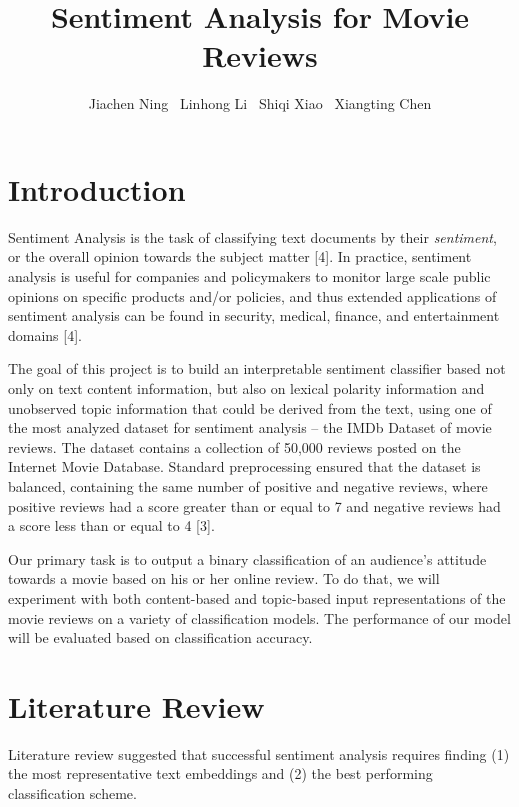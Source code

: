 \documentclass{article}
\title{Sentiment Analysis for Movie Reviews}
\author{%
  Jiachen Ning \ Linhong Li \ Shiqi Xiao \ Xiangting Chen 
}
\begin{document}

\maketitle

\section{Introduction}

Sentiment Analysis is the task of classifying text documents by their {\it sentiment}, or the overall opinion towards the subject matter [4]. In practice, sentiment analysis is useful for companies and policymakers to monitor large scale public opinions on specific products and/or policies, and thus extended applications of sentiment analysis can be found in security, medical, finance, and entertainment domains [4].

The goal of this project is to build an interpretable sentiment classifier based not only on text content information, but also on lexical polarity information and unobserved topic information that could be derived from the text, using one of the most analyzed dataset for sentiment analysis -- the IMDb Dataset of movie reviews. The dataset contains a collection of 50,000 reviews posted on the Internet Movie Database. Standard preprocessing ensured that the dataset is balanced, containing the same number of positive and negative reviews, where positive reviews had a score greater than or equal to 7 and negative reviews had a score less than or equal to 4 [3]. 

Our primary task is to output a binary classification of an audience's attitude towards a movie based on his or her online review. To do that, we will experiment with both content-based and topic-based input representations of the movie reviews on a variety of classification models. The performance of our model will be evaluated based on classification accuracy.



\section{Literature Review}

Literature review suggested that successful sentiment analysis requires finding (1) the most representative text embeddings and (2) the best performing classification scheme. 
\end{document}
